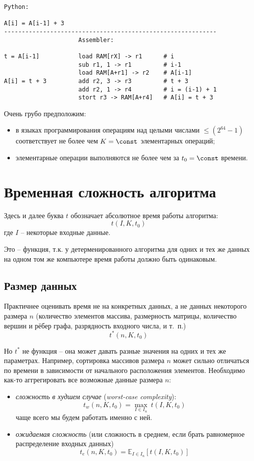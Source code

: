 \begin{verbatim}
Python:

A[i] = A[i-1] + 3
------------------------------------------------------------
                     Assembler:

t = A[i-1]           load RAM[rX] -> r1      # i
                     sub r1, 1 -> r1         # i-1
                     load RAM[A+r1] -> r2    # A[i-1]
A[i] = t + 3         add r2, 3 -> r3         # t + 3
                     add r2, 1 -> r4         # i = (i-1) + 1
                     stort r3 -> RAM[A+r4]   # A[i] = t + 3
\end{verbatim}

Очень грубо предположим:
\begin{itemize}
\item в языках программирования операциям над целыми числами $\leq (2^{64}-1)$ соответствует не более чем $K=\const$ элементарных операций;
\item элементарные операции выполняются не более чем за $t_0=\const$ времени.
\end{itemize}


\section{Временная сложность алгоритма}

Здесь и далее буква $t$ обозначает абсолютное время работы алгоритма:
$$
t(I, K, t_0)
$$
где $I$ -- некоторые входные данные.

Это -- функция, т.к. у детерменированного алгоритма для одних и тех же данных на одном том же компьютере время работы должно быть одинаковым.

\subsection*{Размер данных}

Практичнее оценивать время не на конкретных данных, а не данных некоторого размера $n$ (количество элементов массива, размерность матрицы, количество вершин и рёбер графа, разрядность входного числа, и т.~п.)
$$
t^*(n, K, t_0)
$$

Но $t^*$ не функция -- она может давать разные значения на одних и тех же параметрах. Например, сортировка массивов размера $n$ может сильно отличаться по времени в зависимости от начального расположения элементов. Необходимо как-то аггрегировать все возможные данные размера $n$: 

\begin{itemize}
\item {\em сложность в худшем случае} ({\em worst-case complexity}):
$$
\boxed{
  t_w(n, K, t_0) = \max_{I \in I_n}~{t(I, K, t_0)}  
}
$$
чаще всего мы будем работать именно с ней.
\item {\em ожидаемая сложность} (или сложность в среднем, если брать равномерное распределение входных данных)
$$
t_e(n, K, t_0) = \mathbb{E}_{I \in I_n} \left[ {t(I, K, t_0)} \right]
$$
\end{itemize}

